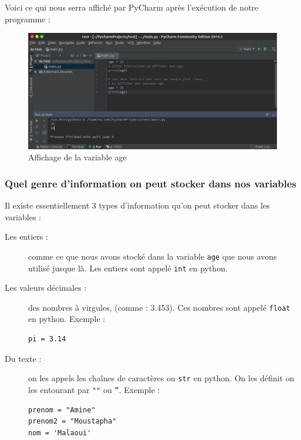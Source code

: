\documentclass[12pt]{article}
\newcommand{\code}[1]{\colorbox{light-gray}{\texttt{#1}}}
\begin{document}
            Voici ce qui nous serra affiché par PyCharm après l'exécution de notre programme :

            \begin{figure}[H]
                \centering
                \includegraphics[width=\linewidth]{img/15_affiche_variables.png}
                \caption{Affichage de la variable age}
            \end{figure}

        \subsubsection{Quel genre d'information on peut stocker dans nos variables}
            Il existe essentiellement 3 types d'information qu'on peut stocker dans les variables :
            \begin{description}
                \item[Les entiers :] comme ce que nous avons stocké dans la variable \code{age} que nous avons 
                    utilisé jusque là. Les entiers sont appelé \code{int} en python.
                \item[Les valeurs décimales :] des nombres à virgules, (comme : 3.453). Ces nombres sont appelé 
                    \code{float} en python. Exemple :
                    \begin{lstlisting}[style=code]
pi = 3.14
                    \end{lstlisting}
                \item[Du texte :] on les appels les chaînes de caractères ou \code{str} en python. On les définit on les
                    entourant par \code{""} ou \code{''}. Exemple :
                    \begin{lstlisting}[style=code]
prenom = "Amine"
prenom2 = "Moustapha"
nom = 'Malaoui'
                    \end{lstlisting}
            \end{description}
\end{document}
